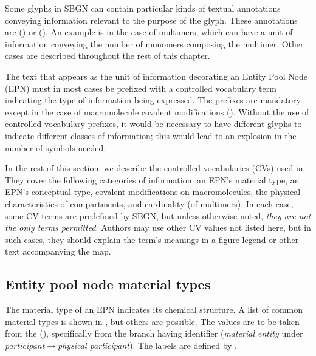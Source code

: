 
Some glyphs in SBGN \PDs can contain particular kinds of textual annotations conveying information relevant to the purpose of the glyph.  These annotations are  () or   ().  An example is in the case of multimers, which can have a unit of information conveying the number of monomers composing the multimer.  Other cases are described throughout the rest of this chapter.

The text that appears as the unit of information decorating an Entity Pool Node (EPN) must in most cases be prefixed with a controlled vocabulary term indicating the type of information being expressed.  The prefixes are mandatory except in the case of macromolecule covalent modifications ().  Without the use of controlled vocabulary prefixes, it would be necessary to have different glyphs to indicate different classes of information; this would lead to an explosion in the number of symbols needed.

In the rest of this section, we describe the controlled vocabularies (CVs) used in \SBGNPDLone.  They cover the following categories of information: an EPN's material type, an EPN's conceptual type, covalent modifications on macromolecules, the physical characteristics of compartments, and cardinality (\eg of multimers).  In each case, some CV terms are predefined by SBGN, but unless otherwise noted, \emph{they are not the only terms permitted}.  Authors may use other CV values not listed here, but in such cases, they should explain the term's meanings in a figure legend or other text accompanying the map.


\subsection{Entity pool node material types}
\label{sec:material-types-cv}

The material type of an EPN indicates its chemical structure.  A list of common material types is shown in , but others are possible.  The values are to be taken from the \sbo (\sbourl), specifically from the branch having identifier  ($\!$\emph{material entity} under \emph{participant}$\rightarrow$\emph{physical participant}).  The labels are defined by \SBGNPDLone.

